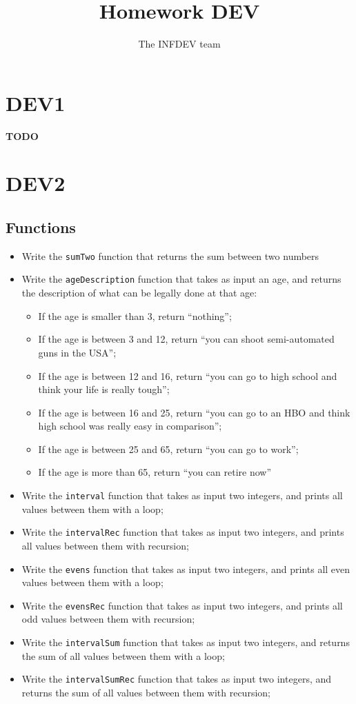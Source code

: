 \documentclass[12pt,a4paper,final]{article}
\author{The INFDEV team}
\title{Homework DEV}
\begin{document}
	\maketitle
	
	\section{DEV1}
			\textbf{TODO}

	\section{DEV2}
		\subsection{Functions}
			\begin{itemize}
				\item Write the \texttt{sumTwo} function that returns the sum between two numbers
				\item Write the \texttt{ageDescription} function that takes as input an age, and returns the description of what can be legally done at that age:
				\begin{itemize}
					\item If the age is smaller than 3, return ``nothing'';
					\item If the age is between 3 and 12, return ``you can shoot semi-automated guns in the USA'';
					\item If the age is between 12 and 16, return ``you can go to high school and think your life is really tough'';
					\item If the age is between 16 and 25, return ``you can go to an HBO and think high school was really easy in comparison'';
					\item If the age is between 25 and 65, return ``you can go to work'';
					\item If the age is more than 65, return ``you can retire now''
				\end{itemize}
				\item Write the \texttt{interval} function that takes as input two integers, and prints all values between them with a loop;
				\item Write the \texttt{intervalRec} function that takes as input two integers, and prints all values between them with recursion;
				\item Write the \texttt{evens} function that takes as input two integers, and prints all even values between them with a loop;
				\item Write the \texttt{evensRec} function that takes as input two integers, and prints all odd values between them with recursion;
				\item Write the \texttt{intervalSum} function that takes as input two integers, and returns the sum of all values between them with a loop;
				\item Write the \texttt{intervalSumRec} function that takes as input two integers, and returns the sum of all values between them with recursion;
			\end{itemize}
	
\end{document}
